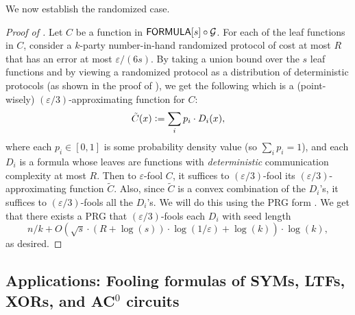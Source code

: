 \documentclass[10pt,a4paper]{article}
\newcommand{\FORMULA}{{\sf FORMULA}}
\begin{document}
	We now establish the randomized case.
    
    \begin{proof}[Proof of ]
    	Let $C$ be a function in $\FORMULA[s]\circ \mathcal{G}$. For each of the leaf functions in $C$, consider a $k$-party number-in-hand randomized protocol of cost at most $R$ that has an error at most $\varepsilon/(6s)$. By taking a union bound over the $s$ leaf functions and by viewing a randomized protocol as a distribution of deterministic protocols (as shown in the proof of ), we get the following which is a (point-wisely) $(\varepsilon/3)$-approximating function for $C$:
        \[
            \tilde{C}(x) \vcentcolon=\sum_{i} p_i \cdot D_i(x),
        \]
        where each $p_i\in[0,1]$ is some probability density value (so $\sum_i p_i =1$), and each $D_i$ is a formula whose leaves are functions with \emph{deterministic} communication complexity at most $R$. Then to $\varepsilon$-fool $C$, it suffices to $(\varepsilon/3)$-fool its $(\varepsilon/3)$-approximating function $\tilde{C}$. Also, since $\tilde{C}$ is a convex combination of the $D_i$'s, it suffices to $(\varepsilon/3)$-fools all the $D_i$'s. We will do this using the PRG form . We get that there exists a PRG that $(\varepsilon/3)$-fools each $D_i$ with seed length
        \[
            n/k+O\left(\sqrt{s}\cdot(R+\log(s))\cdot\log(1/\varepsilon)+\log(k)\right)\cdot\log(k),
        \]
        as desired.
    \end{proof}

%
   
%
   
%
%
%
%
%
%
	
%
	
%
	
%
%
%
%
%
%
	
%
	
%
%
%

%
%
%
%
%
%
%
%
%
%
%
%
%
%
%
%
%
%
%
%
%
%
%
%
%
%
%
%
%
%
%
%
%
%
%
%
%
%
%
%
%
%
%
%
%
%
%
%
%
%
%
%
%
    
%
	
%
    
%
%
%
%
%
%
	
%
%
%
	
%
    
%
%
%
%
%
%
%
%
%
%
%

    \subsection{Applications: Fooling formulas of SYMs, LTFs, XORs, and AC\texorpdfstring{$^0$ circuits}{AC0}}
\end{document}
